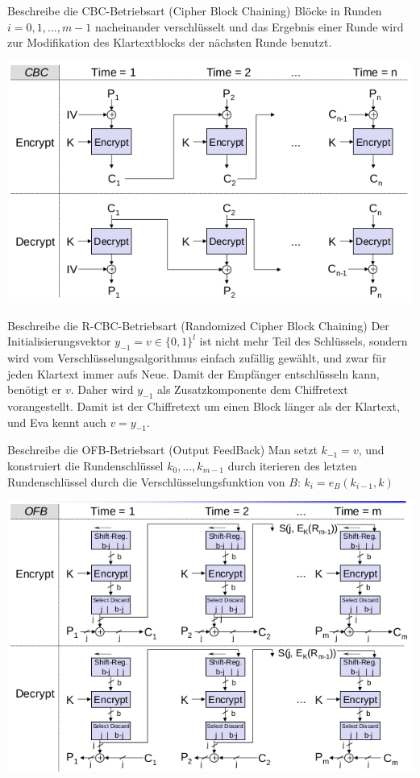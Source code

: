 \documentclass[avery5371, frame]{flashcards}
\begin{document}
\begin{flashcard}[Betriebsarten]{Beschreibe die CBC-Betriebsart (Cipher Block Chaining)}
    Blöcke in Runden $i=0, 1 ,\dots,m-1$ nacheinander verschlüsselt und das Ergebnis einer Runde wird zur Modifikation des Klartextblocks der nächsten Runde benutzt.

    \includegraphics[width=.6\linewidth]{Assets/NetworkSecurity-cipher-block-chaining-mode.png}
\end{flashcard}

\begin{flashcard}[Betriebsarten]{Beschreibe die R-CBC-Betriebsart (Randomized Cipher Block Chaining)}
    Der Initialisierungsvektor $y_{-1}=v\in\{0,1\}^l$ ist nicht mehr Teil des Schlüssels, sondern wird vom Verschlüsselungsalgorithmus einfach zufällig gewählt, und zwar für jeden Klartext immer aufs Neue. Damit der Empfänger entschlüsseln kann, benötigt er $v$. Daher wird $y_{-1}$ als Zusatzkomponente dem Chiffretext vorangestellt. Damit ist der Chiffretext um einen Block länger als der Klartext, und Eva kennt auch $v=y_{-1}$.
\end{flashcard}

\begin{flashcard}[Betriebsarten]{Beschreibe die OFB-Betriebsart (Output FeedBack)}
    Man setzt $k_{-1}=v$, und konstruiert die Rundenschlüssel $k_0,...,k_{m-1}$ durch iterieren des letzten Rundenschlüssel durch die Verschlüsselungsfunktion von $B$: $k_i=e_B(k_{i-1}, k)$%

    \includegraphics[width=.5\linewidth]{Assets/NetworkSecurity-output-feedback-mode.png}
\end{flashcard}
\end{document}
